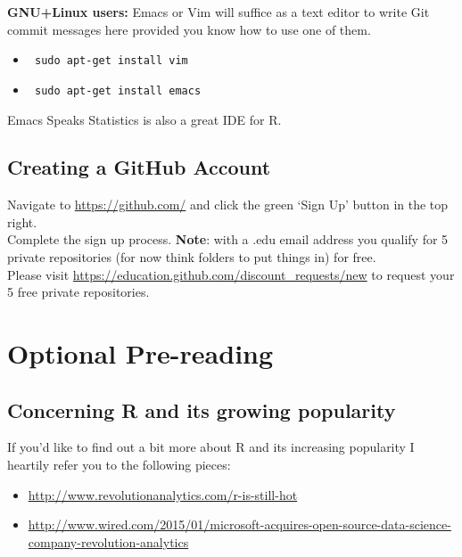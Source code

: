 \documentclass{article}[12pt]
\begin{document}
\textbf{GNU+Linux users:} Emacs or Vim will suffice as a text editor to write Git commit messages here provided you know how to use one of them.
\begin{itemize}
\item \begin{verbatim} sudo apt-get install vim \end{verbatim} 
\item \begin{verbatim} sudo apt-get install emacs \end{verbatim} 
\end{itemize}
Emacs Speaks Statistics is also a great IDE for R.

\subsection*{Creating a GitHub Account}
Navigate to \url{https://github.com/} and click the green `Sign Up' button in the top right.\\
Complete the sign up process.
\newline
\newline
\textbf{Note}: with a .edu email address you qualify for 5 private repositories (for now think folders to put things in) for free.\\
Please visit \url{https://education.github.com/discount_requests/new} to request your 5 free private repositories.

\section*{Optional Pre-reading}
\subsection*{Concerning R and its growing popularity}
If you'd like to find out a bit more about R and its increasing popularity I heartily refer you to the following pieces: \begin{itemize}
\item \url{http://www.revolutionanalytics.com/r-is-still-hot}
\item \href{http://www.wired.com/2015/01/microsoft-acquires-open-source-data-science-company-revolution-analytics}{http://www.wired.com/2015/01/microsoft-acquires-open-source-data-science-company-revolution-analytics}
\end{itemize}
\end{document}
